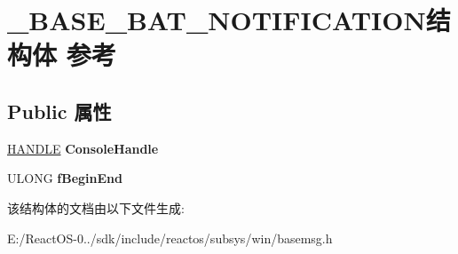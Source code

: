 \hypertarget{struct___b_a_s_e___b_a_t___n_o_t_i_f_i_c_a_t_i_o_n}{}\section{\+\_\+\+B\+A\+S\+E\+\_\+\+B\+A\+T\+\_\+\+N\+O\+T\+I\+F\+I\+C\+A\+T\+I\+O\+N结构体 参考}
\label{struct___b_a_s_e___b_a_t___n_o_t_i_f_i_c_a_t_i_o_n}
\subsection*{Public 属性}
\begin{DoxyCompactItemize}
\item 
\mbox{\label{struct___b_a_s_e___b_a_t___n_o_t_i_f_i_c_a_t_i_o_n_aa54aa9b13a870cb662ecdb682e6ccd57}} 
\hyperlink{interfacevoid}{H\+A\+N\+D\+LE} {\bfseries Console\+Handle}
\item 
\mbox{\label{struct___b_a_s_e___b_a_t___n_o_t_i_f_i_c_a_t_i_o_n_af730362e293605022fcec9be8d8299dc}} 
U\+L\+O\+NG {\bfseries f\+Begin\+End}
\end{DoxyCompactItemize}


该结构体的文档由以下文件生成\+:\begin{DoxyCompactItemize}
\item 
E\+:/\+React\+O\+S-\/0../sdk/include/reactos/subsys/win/basemsg.\+h\end{DoxyCompactItemize}
